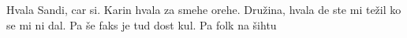 \zahvala
Hvala Sandi, car si. 
Karin hvala za smehe orehe. 
Družina, hvala de ste mi težil ko se mi ni dal.
Pa še faks je tud dost kul.
Pa folk na šihtu